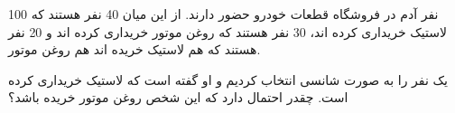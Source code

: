 100 نفر آدم در فروشگاه قطعات خودرو حضور دارند.
از این میان 40 نفر هستند که لاستیک خریداری کرده اند، 
30 نفر هستند که روغن موتور خریداری کرده اند 
و 20 نفر هستند که هم لاستیک خریده اند هم روغن
موتور.

یک نفر را به صورت شانسی انتخاب کردیم و او گفته است که لاستیک خریداری کرده است. چقدر احتمال دارد که این شخص روغن موتور خریده باشد؟

\\
